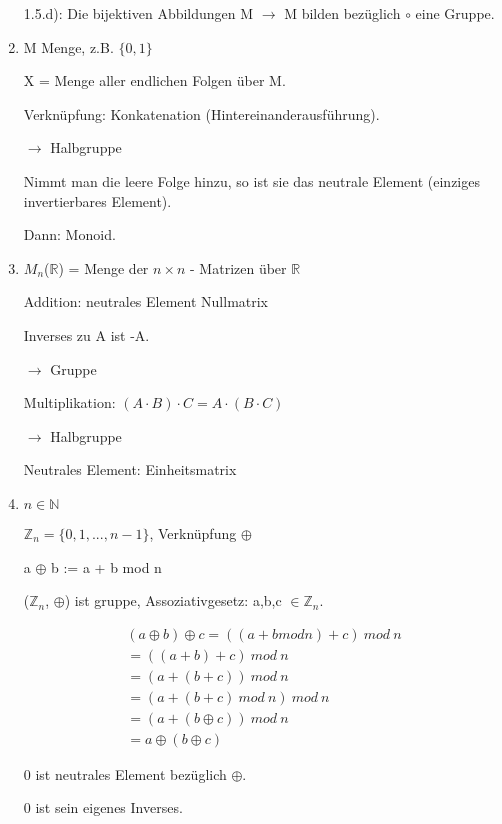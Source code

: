 \documentclass[a4paper, openany]{book}
\begin{document}
\begin{enumerate}[label=(\alph*)]
    1.5.d): Die bijektiven Abbildungen M $\rightarrow$ M bilden bezüglich $\circ$ eine Gruppe.

    \item M Menge, z.B. $\lbrace 0, 1 \rbrace$

    X  = Menge aller endlichen Folgen über M.

    Verknüpfung: Konkatenation (Hintereinanderausführung).

    $\rightarrow$ Halbgruppe

    Nimmt man die leere Folge hinzu, so ist sie das neutrale Element (einziges invertierbares Element).

    Dann: Monoid.

    \item $M_n$($\mathbb{R}$) = Menge der $n \times n$ - Matrizen über $\mathbb{R}$

    Addition: neutrales Element Nullmatrix 

    Inverses zu A ist -A.

    $\rightarrow$ Gruppe

    Multiplikation: $(A \cdot B) \cdot C = A \cdot (B \cdot C)$ 

    $\rightarrow$ Halbgruppe

    Neutrales Element: Einheitsmatrix

    \item $n \in \mathbb{N}$

    $\mathbb{Z}_n =  \{0,1,...,n-1\}$, Verknüpfung $\oplus$

    a $\oplus$ b := a + b mod n

    ($\mathbb{Z}_n$, $\oplus$) ist gruppe, Assoziativgesetz: a,b,c $\in \mathbb{Z}_n$.

    \begin{equation}
      \begin{split}
        (a \oplus b) \oplus c = ((a+b mod n) + c) \ mod \ n \\
        = ((a+b)+c) \ mod \ n \\
        = (a+(b+c))\  mod \ n \\
        = (a+(b+c) \ mod \ n) \ mod \ n \\
        = (a+(b \oplus c)) \ mod \ n \\
        = a \oplus (b \oplus c)
      \end{split}
    \end{equation}

    0 ist neutrales Element bezüglich $\oplus$.

    0 ist sein eigenes Inverses.


\end{enumerate}
\end{document}
